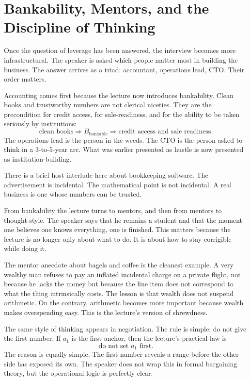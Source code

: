 \section{Bankability, Mentors, and the Discipline of Thinking}

Once the question of leverage has been answered, the interview becomes more infrastructural. The speaker is asked which people matter most in building the business. The answer arrives as a triad: accountant, operations lead, CTO. Their order matters.

Accounting comes first because the lecture now introduces bankability. Clean books and trustworthy numbers are not clerical niceties. They are the precondition for credit access, for sale-readiness, and for the ability to be taken seriously by institutions:
\begin{equation}
\text{clean books} \Rightarrow B_{\text{bankable}} \Rightarrow \text{credit access and sale readiness}.
\end{equation}
The operations lead is the person in the weeds. The CTO is the person asked to think in a \(3\)-to-\(5\)-year arc. What was earlier presented as hustle is now presented as institution-building.

There is a brief host interlude here about bookkeeping software. The advertisement is incidental. The mathematical point is not incidental. A real business is one whose numbers can be trusted.

From bankability the lecture turns to mentors, and then from mentors to thought-style. The speaker says that he remains a student and that the moment one believes one knows everything, one is finished. This matters because the lecture is no longer only about what to do. It is about how to stay corrigible while doing it.

The mentor anecdote about bagels and coffee is the cleanest example. A very wealthy man refuses to pay an inflated incidental charge on a private flight, not because he lacks the money but because the line item does not correspond to what the thing intrinsically costs. The lesson is that wealth does not suspend arithmetic. On the contrary, arithmetic becomes more important because wealth makes overspending easy. This is the lecture’s version of shrewdness.

The same style of thinking appears in negotiation. The rule is simple: do not give the first number. If \(a_1\) is the first anchor, then the lecture’s practical law is
\begin{equation}
\text{do not set } a_1 \text{ first.}
\end{equation}
The reason is equally simple. The first number reveals a range before the other side has exposed its own. The speaker does not wrap this in formal bargaining theory, but the operational logic is perfectly clear.

